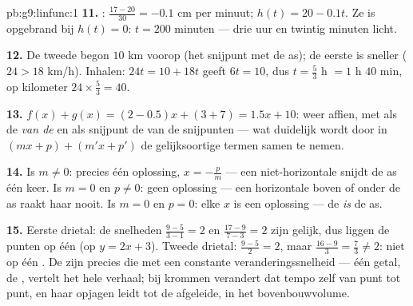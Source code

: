 \begin{solution}{pb:g9:linfunc:1}
\textbf{11.} : $\frac{17 - 20}{30} = -0.1$ cm per minuut;
$h(t) = 20 - 0.1t$. Ze is opgebrand bij $h(t) = 0$: $t = 200$ minuten --- drie uur
en twintig minuten licht.

\textbf{12.} De tweede begon $10$ km voorop (het snijpunt met de as); de eerste is
sneller ($24 > 18$ km/h). Inhalen: $24t = 10 + 18t$ geeft $6t = 10$, dus
$t = \frac53$ h $= 1$ h $40$ min, op kilometer $24 \times \frac53 = 40$.

\textbf{13.} $f(x) + g(x) = (2 - 0.5)x + (3 + 7) = 1.5x + 10$: weer affien, met
als  de \emph{ van de } en als
snijpunt de  van de snijpunten --- wat duidelijk wordt door in
$(mx + p) + (m'x + p')$ de gelijksoortige termen samen te nemen.

\textbf{14.} Is $m \neq 0$: precies één oplossing, $x = -\frac pm$ --- een
niet-horizontale  snijdt de as één keer. Is $m = 0$ en $p \neq 0$: geen
oplossing --- een horizontale  boven of onder de as raakt haar nooit. Is
$m = 0$ en $p = 0$: elke $x$ is een oplossing --- de  \emph{is} de as.

\textbf{15.} Eerste drietal: de snelheden $\frac{9 - 5}{3 - 1} = 2$ en
$\frac{17 - 9}{7 - 3} = 2$ zijn gelijk, dus liggen de punten op één  (op
$y = 2x + 3$). Tweede drietal: $\frac{9-5}{2} = 2$, maar
$\frac{16 - 9}{3} = \frac73 \neq 2$: niet op één . De  zijn
precies die met een constante veranderingssnelheid --- één getal, de
, vertelt het hele verhaal; bij krommen verandert dat tempo
zelf van punt tot punt, en haar opjagen leidt tot de afgeleide, in het
bovenbouwvolume.
\end{solution}
